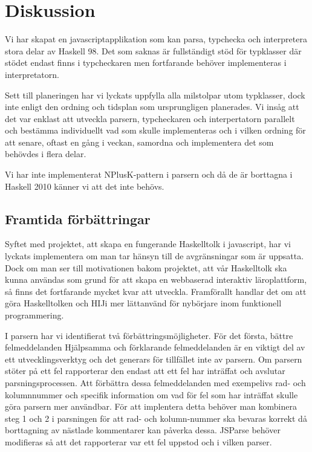 \section{Diskussion}
Vi har skapat en javascriptapplikation som kan parsa, typchecka och interpretera stora delar av Haskell 98. Det som saknas är fullständigt stöd för typklasser där 
stödet endast finns i typcheckaren men fortfarande behöver implementeras i interpretatorn.

Sett till planeringen har vi lyckats uppfylla alla milstolpar utom typklasser, dock inte enligt den ordning och tidsplan som ursprungligen planerades. 
Vi insåg att det var enklast att utveckla parsern, typcheckaren och interpertatorn parallelt och bestämma individuellt vad som skulle implementeras och i 
vilken ordning för att senare, oftast en gång i veckan, samordna och implementera det som behövdes i flera delar.

Vi har inte implementerat NPlusK-pattern i parsern och då de är borttagna i Haskell 2010 \citep{haskell2010} känner vi att det inte behövs.



\subsection{Framtida förbättringar}

Syftet med projektet, att skapa en fungerande Haskelltolk i javascript, har vi lyckats implementera om man tar hänsyn till de avgränsningar som är uppsatta. Dock om man ser till motivationen bakom projektet, att vår Haskelltolk ska kunna användas som grund för att skapa en webbaserad interaktiv läroplattform, så finns det fortfarande mycket kvar att utveckla. Framförallt handlar det om att göra Haskelltolken och HIJi mer lättanvänd för nybörjare inom funktionell programmering.

I parsern har vi identifierat två förbättringsmöjligheter. För det första, bättre felmeddelanden
Hjälpsamma och förklarande felmeddelanden är en viktigt del av ett utvecklingsverktyg och det generars för tillfället inte av parsern. 
Om parsern stöter på ett fel rapporterar den endast att ett fel har inträffat och avslutar parsningsprocessen. 
Att förbättra dessa felmeddelanden med exempelivs rad- och kolumnnummer och specifik information om vad för fel som har inträffat skulle göra parsern mer användbar.
För att implentera detta behöver man kombinera steg 1 och 2 i parsningen för att rad- och kolumn-nummer ska bevaras korrekt då borttagning av nästlade kommentarer kan påverka dessa.
JSParse behöver modifieras så att det rapporterar var ett fel uppstod och i vilken parser.

